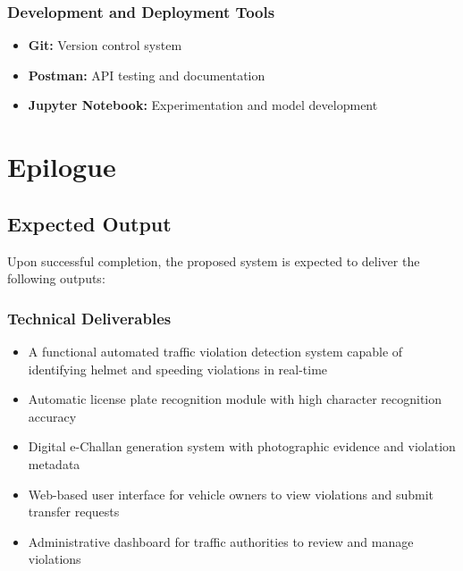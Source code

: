 \documentclass[12pt, a4paper, oneside]{memoir}
\begin{document}
\subsection{Development and Deployment Tools}
\begin{itemize}
    \item \textbf{Git:} Version control system
    \item \textbf{Postman:} API testing and documentation
    \item \textbf{Jupyter Notebook:} Experimentation and model development
\end{itemize}


\chapter{Epilogue}

\section{Expected Output}

Upon successful completion, the proposed system is expected to deliver the following outputs:

\subsection{Technical Deliverables}
\begin{itemize}
    \item A functional automated traffic violation detection system capable of identifying helmet and speeding violations in real-time
    \item Automatic license plate recognition module with high character recognition accuracy
    \item Digital e-Challan generation system with photographic evidence and violation metadata
    \item Web-based user interface for vehicle owners to view violations and submit transfer requests
    \item Administrative dashboard for traffic authorities to review and manage violations
\end{itemize}
\end{document}
